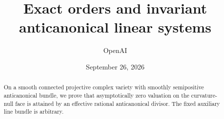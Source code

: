 \documentclass[11pt,reqno]{amsart}
\title[Exact orders and invariant anticanonical systems]{Exact orders and invariant anticanonical linear systems}
\author{OpenAI}\date{September 26, 2026}
\numberwithin{equation}{section}
\theoremstyle{definition}\newtheorem{definition}[theorem]{Definition}
\theoremstyle{remark}\newtheorem{remark}[theorem]{Remark}
\begin{document}
\raggedbottom
\begin{abstract}
On a smooth connected projective complex variety with smoothly
semipositive anticanonical bundle, we prove that asymptotically zero valuation on the curvature-null face is attained by
an effective rational anticanonical divisor. The fixed auxiliary line
bundle is arbitrary.
\end{abstract}
\maketitle
\tableofcontents
















\end{document}
